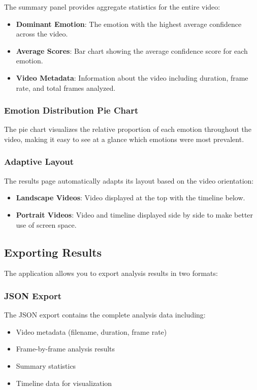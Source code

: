 The summary panel provides aggregate statistics for the entire video:

\begin{itemize}
    \item \textbf{Dominant Emotion}: The emotion with the highest average confidence across the video.
    \item \textbf{Average Scores}: Bar chart showing the average confidence score for each emotion.
    \item \textbf{Video Metadata}: Information about the video including duration, frame rate, and total frames analyzed.
\end{itemize}

\subsubsection{Emotion Distribution Pie Chart}

The pie chart visualizes the relative proportion of each emotion throughout the video, making it easy to see at a glance which emotions were most prevalent.

\subsubsection{Adaptive Layout}

The results page automatically adapts its layout based on the video orientation:

\begin{itemize}
    \item \textbf{Landscape Videos}: Video displayed at the top with the timeline below.
    \item \textbf{Portrait Videos}: Video and timeline displayed side by side to make better use of screen space.
\end{itemize}

\subsection{Exporting Results}

The application allows you to export analysis results in two formats:

\subsubsection{JSON Export}

The JSON export contains the complete analysis data including:
\begin{itemize}
    \item Video metadata (filename, duration, frame rate)
    \item Frame-by-frame analysis results
    \item Summary statistics
    \item Timeline data for visualization
\end{itemize}

